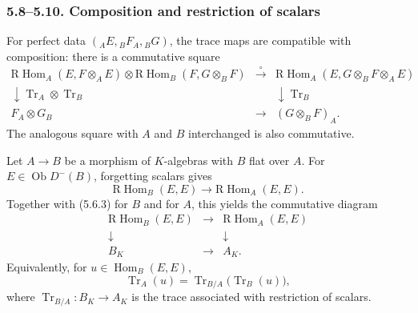 \documentclass[12pt]{article}
\newcommand{\Hom}{\operatorname{Hom}}
\newcommand{\Tr}{\operatorname{Tr}}
\newcommand{\ob}{\operatorname{Ob}}
\newcommand{\R}{\mathrm R}
\begin{document}
\subsubsection*{5.8--5.10. Composition and restriction of scalars}
For perfect data $({}_AE,{}_BF_A,{}_BG)$, the trace maps are compatible with composition: there is a commutative square
\[
\begin{array}{ccc}
\R\Hom_A(E,F\otimes_AE)\otimes\R\Hom_B(F,G\otimes_BF) & \xrightarrow{\circ} & \R\Hom_A(E,G\otimes_BF\otimes_AE)\\
\downarrow \Tr_A\otimes\Tr_B && \downarrow \Tr_B\\
F_A\otimes G_B & \longrightarrow & (G\otimes_BF)_A.
\end{array}
\]
The analogous square with $A$ and $B$ interchanged is also commutative.

Let $A\to B$ be a morphism of $K$-algebras with $B$ flat over $A$. For $E\in\ob D^-(B)$, forgetting scalars gives
\begin{equation}
   \R\Hom_B(E,E)\to \R\Hom_A(E,E).                                 \tag{5.10.1}
\end{equation}
Together with (5.6.3) for $B$ and for $A$, this yields the commutative diagram
\[
\begin{array}{ccc}
\R\Hom_B(E,E) & \to & \R\Hom_A(E,E)\\
\downarrow && \downarrow\\
B_K & \to & A_K .
\end{array}
\]
Equivalently, for $u\in\Hom_B(E,E)$,
\begin{equation}
   \Tr_A(u)=\Tr_{B/A}\bigl(\Tr_B(u)\bigr),                         \tag{5.10.3}
\end{equation}
where $\Tr_{B/A}:B_K\to A_K$ is the trace associated with restriction of scalars.

\bigskip
\end{document}
